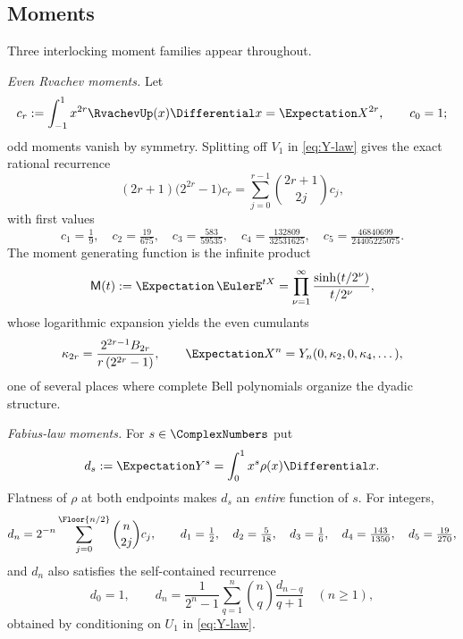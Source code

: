 \documentclass[11pt,oneside]{article}
\numberwithin{equation}{section}
\theoremstyle{definition}
\theoremstyle{remark}
\newcommand{\Bell}{Y}
\newcommand{\MM}{\mathsf M}
\begin{document}
\subsection{Moments}
\label{sec:moments}

Three interlocking moment families appear throughout.

\emph{Even Rvachev moments.}  Let
\begin{equation}
 c_r:=\int_{-1}^{1}x^{2r}\RvachevUp(x)\Differential x=\Expectation X^{2r},
 \qquad c_0=1;
 \label{eq:c-def}
\end{equation}
odd moments vanish by symmetry.  Splitting off $V_1$ in
\eqref{eq:Y-law} gives the exact rational recurrence
\begin{equation}
 (2r+1)\bigl(2^{2r}-1\bigr)c_r
 =\sum_{j=0}^{r-1}\binom{2r+1}{2j}c_j,
 \label{eq:c-recurrence}
\end{equation}
with first values
\begin{equation}
 c_1=\tfrac19,\quad
 c_2=\tfrac{19}{675},\quad
 c_3=\tfrac{583}{59535},\quad
 c_4=\tfrac{132809}{32531625},\quad
 c_5=\tfrac{46840699}{24405225075}.
 \label{eq:c-values}
\end{equation}
The moment generating function is the infinite product
\begin{equation}
 \MM(t):=\Expectation\,\EulerE^{tX}
 =\prod_{\nu=1}^{\infty}\frac{\sinh(t/2^\nu)}{t/2^\nu},
 \label{eq:M-def}
\end{equation}
whose logarithmic expansion yields the even cumulants
\begin{equation}
 \kappa_{2r}=\frac{2^{2r-1}B_{2r}}{r\,(2^{2r}-1)},
 \qquad
 \Expectation X^{n}
 =\Bell_n(0,\kappa_2,0,\kappa_4,\dots),
 \label{eq:cumulants}
\end{equation}
one of several places where complete Bell polynomials organize the
dyadic structure.

\emph{Fabius-law moments.}  For $s\in\ComplexNumbers$ put
\begin{equation}
 d_s:=\Expectation Y^{s}=\int_0^1x^{s}\rho(x)\Differential x.
 \label{eq:d-def}
\end{equation}
Flatness of $\rho$ at both endpoints makes $d_s$ an \emph{entire}
function of $s$.  For integers,
\begin{equation}
 d_n=2^{-n}\sum_{j=0}^{\Floor{n/2}}\binom n{2j}c_j,
 \qquad
 d_1=\tfrac12,\quad d_2=\tfrac5{18},\quad d_3=\tfrac16,\quad
 d_4=\tfrac{143}{1350},\quad d_5=\tfrac{19}{270},
 \label{eq:d-from-c}
\end{equation}
and $d_n$ also satisfies the self-contained recurrence
\begin{equation}
 d_0=1,\qquad
 d_n=\frac{1}{2^{n}-1}
 \sum_{q=1}^{n}\binom nq\frac{d_{n-q}}{q+1}
 \quad(n\ge1),
 \label{eq:d-recurrence}
\end{equation}
obtained by conditioning on $U_1$ in \eqref{eq:Y-law}.
\end{document}
